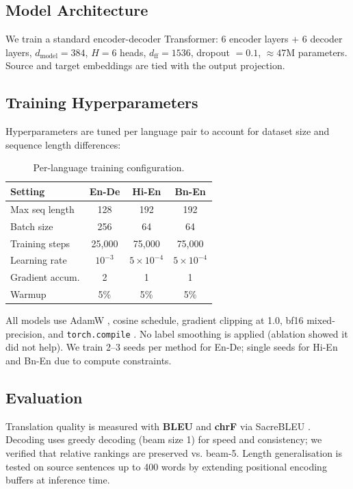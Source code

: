 \documentclass[conference]{IEEEtran}
\begin{document}
\subsection{Model Architecture}

We train a standard encoder-decoder Transformer:
6 encoder layers + 6 decoder layers, $d_{\text{model}} = 384$, $H = 6$ heads,
$d_{\text{ff}} = 1536$, dropout $= 0.1$, $\approx 47$M parameters.
Source and target embeddings are tied with the output projection.

\subsection{Training Hyperparameters}

Hyperparameters are tuned per language pair to account for dataset size and
sequence length differences:

\begin{table}[htbp]
  \caption{Per-language training configuration.}
  \label{tab:hyperparams}
  \centering
  \begin{tabular}{lccc}
    \toprule
    \textbf{Setting} & \textbf{En-De} & \textbf{Hi-En} & \textbf{Bn-En} \\
    \midrule
    Max seq length & 128 & 192 & 192 \\
    Batch size & 256 & 64 & 64 \\
    Training steps & 25,000 & 75,000 & 75,000 \\
    Learning rate & $10^{-3}$ & $5 \times 10^{-4}$ & $5 \times 10^{-4}$ \\
    Gradient accum. & 2 & 1 & 1 \\
    Warmup & 5\% & 5\% & 5\% \\
    \bottomrule
  \end{tabular}
\end{table}

All models use AdamW \cite{loshchilov2018decoupled}, cosine schedule,
gradient clipping at 1.0, bf16 mixed-precision, and \texttt{torch.compile}
\cite{pytorch2023}. No label smoothing is applied (ablation showed it did not
help). We train 2--3 seeds per method for En-De; single seeds for Hi-En and
Bn-En due to compute constraints.

\subsection{Evaluation}

Translation quality is measured with \textbf{BLEU} \cite{papineni2002bleu} and
\textbf{chrF} \cite{popovic2015chrf} via SacreBLEU \cite{post2018sacrebleu}.
Decoding uses greedy decoding (beam size 1) for speed and consistency;
we verified that relative rankings are preserved vs. beam-5. Length
generalisation is tested on source sentences up to 400 words by extending
positional encoding buffers at inference time.
\end{document}
